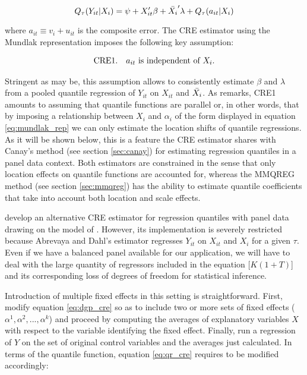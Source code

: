 \documentclass{article}
\begin{document}
\begin{equation}\label{eq:qr_cre}
    Q_{\tau}(Y_{it} | X_i) = \psi + X_{it}' \beta + \Bar{X_i}' \lambda + Q_{\tau}(a_{it} | X_i)
\end{equation}

where $a_{it} \equiv v_i + u_{it}$ is the composite error. The CRE estimator using the Mundlak representation imposes the following key assumption:

\begin{gather}
    \text{CRE1.\quad $a_{it}$ is independent of $X_i$.}\label{eq:cre1}
\end{gather}

Stringent as may be, this assumption allows to consistently estimate $\beta$ and $\lambda$ from a pooled quantile regression of $Y_{it}$ on $X_{it}$ and $\Bar{X_{i}}$. As \cite{wooldridge2010} remarks, CRE1 amounts to assuming that quantile functions are parallel or, in other words, that by imposing a relationship between $X_{i}$ and $\alpha_i$ of the form displayed in equation \ref{eq:mundlak_rep} we can only estimate the location shifts of quantile regressions. As it will be shown below, this is a feature the CRE estimator shares with Canay's method (see section \ref{sec:canay}) for estimating regression quantiles in a panel data context. Both estimators are constrained in the sense that only location effects on quantile functions are accounted for, whereas the MMQREG method (see section \ref{sec:mmqreg}) has the ability to estimate quantile coefficients that take into account both location and scale effects.

\cite{abrevaya2008} develop an alternative CRE estimator for regression quantiles with panel data drawing on the model of \cite{chamberlain1982}. However, its implementation is severely restricted because Abrevaya and Dahl's estimator regresses $Y_{it}$ on $X_{it}$ and $X_{i}$ for a given $\tau$. Even if we have a balanced panel available for our application, we will have to deal with the large quantity of regressors included in the equation [$K(1+T)$] and its corresponding loss of degrees of freedom for statistical inference.

Introduction of multiple fixed effects in this setting is straightforward. First, modify equation \ref{eq:dgp_cre} so as to include two or more sets of fixed effects ($\alpha^1, \alpha^2, ..., \alpha^k$) and proceed by computing the averages of explanatory variables $X$ with respect to the variable identifying the fixed effect. Finally, run a regression of $Y$ on the set of original control variables and the averages just calculated. In terms of the quantile function, equation \ref{eq:qr_cre} requires to be modified accordingly:
\end{document}
